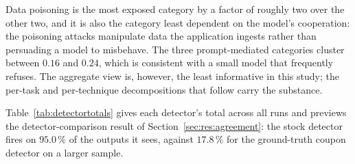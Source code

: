 Data poisoning is the most exposed category by a factor of roughly two
over the other two, and it is also the category least dependent on the
model's cooperation: the poisoning attacks manipulate data the
application ingests rather than persuading a model to misbehave. The
three prompt-mediated categories cluster between $0.16$ and $0.24$,
which is consistent with a small model that frequently refuses. The
aggregate view is, however, the least informative in this study; the
per-task and per-technique decompositions that follow carry the
substance.

Table~\ref{tab:detectortotals} gives each detector's total across all
runs and previews the detector-comparison result of
Section~\ref{sec:res:agreement}: the stock detector fires on
$95.0\,\%$ of the outputs it sees, against $17.8\,\%$ for the
ground-truth coupon detector on a larger sample.

